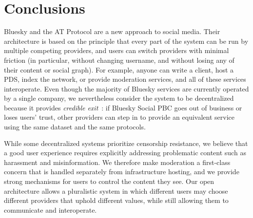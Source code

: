 \documentclass[sigconf]{acmart}
\begin{document}



\section{Conclusions}

Bluesky and the AT Protocol are a new approach to social media.
Their architecture is based on the principle that every part of the system can be run by multiple competing providers, and users can switch providers with minimal friction (in particular, without changing username, and without losing any of their content or social graph).
For example, anyone can write a client, host a PDS, index the network, or provide moderation services, and all of these services interoperate.
Even though the majority of Bluesky services are currently operated by a single company, we nevertheless consider the system to be decentralized because it provides \emph{credible exit}~\cite{NewboldProgress}: if Bluesky Social PBC goes out of business or loses users' trust, other providers can step in to provide an equivalent service using the same dataset and the same protocols.


While some decentralized systems prioritize censorship resistance, we believe that a good user experience requires explicitly addressing problematic content such as harassment and misinformation.
We therefore make moderation a first-class concern that is handled separately from infrastructure hosting, and we provide strong mechanisms for users to control the content they see.
Our open architecture allows a pluralistic system in which different users may choose different providers that uphold different values, while still allowing them to communicate and interoperate.
\end{document}
